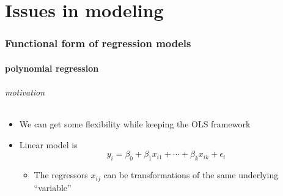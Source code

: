 

\part*{Issues in modeling}%
\section{Functional form of regression models}
\subsection{polynomial regression}

\paragraph{motivation}

\begin{itemize}
\item We can get some flexibility while keeping the OLS framework
\item Linear model is
        \[y_i = \beta_0 + \beta_1 x_{i1} + \cdots + \beta_k x_{ik} +
        \epsilon_i\]
\begin{itemize}
\item The regressors $x_{ij}$ can be transformations of the same
          underlying ``variable''
\end{itemize}
\end{itemize}

